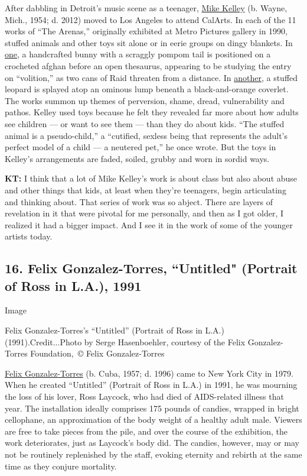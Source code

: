 After dabbling in Detroit's music scene as a teenager,
\href{http://www.mikekelleyfoundation.org/}{Mike Kelley} (b. Wayne,
Mich., 1954; d. 2012) moved to Los Angeles to attend CalArts. In each of
the 11 works of ``The Arenas,'' originally exhibited at Metro Pictures
gallery in 1990, stuffed animals and other toys sit alone or in eerie
groups on dingy blankets. In
\href{https://www.christies.com/lotfinder/Lot/mike-kelley-b-1954-arena-11-5495764-details.aspx}{one},
a handcrafted bunny with a scraggly pompom tail is positioned on a
crocheted afghan before an open thesaurus, appearing to be studying the
entry on ``volition,'' as two cans of Raid threaten from a distance. In
\href{https://www.christies.com/lotfinder/Lot/mike-kelley-1954-2012-arena-8-leopard-5994792-details.aspx}{another},
a stuffed leopard is splayed atop an ominous lump beneath a
black-and-orange coverlet. The works summon up themes of perversion,
shame, dread, vulnerability and pathos. Kelley used toys because he felt
they revealed far more about how adults see children --- or want to see
them --- than they do about kids. ``The stuffed animal is a
pseudo-child,'' a ``cutified, sexless being that represents the adult's
perfect model of a child --- a neutered pet,'' he once wrote. But the
toys in Kelley's arrangements are faded, soiled, grubby and worn in
sordid ways.

\textbf{KT:} I think that a lot of Mike Kelley's work is about class but
also about abuse and other things that kids, at least when they're
teenagers, begin articulating and thinking about. That series of work
was so abject. There are layers of revelation in it that were pivotal
for me personally, and then as I got older, I realized it had a bigger
impact. And I see it in the work of some of the younger artists today.

\hypertarget{16-felix-gonzalez-torres-untitled-portrait-of-ross-in-la-1991}{%
\subsection{16. Felix Gonzalez-Torres, ``Untitled" (Portrait of Ross in
L.A.),
1991}\label{16-felix-gonzalez-torres-untitled-portrait-of-ross-in-la-1991}}

Image

Felix Gonzalez-Torres's ``Untitled'' (Portrait of Ross in L.A.)
(1991).Credit...Photo by Serge Hasenboehler, courtesy of the Felix
Gonzalez-Torres Foundation,~© Felix Gonzalez-Torres

\href{https://www.felixgonzalez-torresfoundation.org/}{Felix
Gonzalez-Torres} (b. Cuba, 1957; d. 1996) came to New York City in 1979.
When he created ``Untitled'' (Portrait of Ross in L.A.) in 1991, he was
mourning the loss of his lover, Ross Laycock, who had died of
AIDS-related illness that year. The installation ideally comprises 175
pounds of candies, wrapped in bright cellophane, an approximation of the
body weight of a healthy adult male. Viewers are free to take pieces
from the pile, and over the course of the exhibition, the work
deteriorates, just as Laycock's body did. The candies, however, may or
may not be routinely replenished by the staff, evoking eternity and
rebirth at the same time as they conjure mortality.

